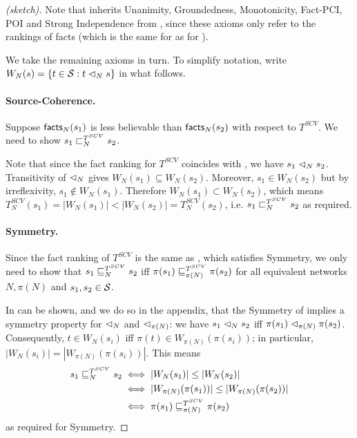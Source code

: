 \begin{proof}[ (sketch)]

Note that \scvoting{} inherits Unanimity, Groundedness, Monotonicity, Fact-PCI,
POI and Strong Independence from \voting{}, since these axioms only refer to
the rankings of facts (which is the same for \scvoting{} as for \voting{}).

We take the remaining axioms in turn. To simplify notation, write $W_N(s) = \{t
\in \S : t \scoh_N s \}$ in what follows.

\paragraph{Source-Coherence.}

Suppose $\facts_N(s_1)$ is less believable than $\facts_N(s_2)$ with respect to
$T^{SCV}$. We need to show $s_1 \slt_N^{T^{SCV}} s_2$.

Note that since the fact ranking for $T^{SCV}$ coincides with \voting{}, we
have $s_1 \scoh_N s_2$. Transitivity of ${\scoh_N}$ gives $W_N(s_1) \subseteq
W_N(s_2)$. Moreover, $s_1 \in W_N(s_2)$ but by irreflexivity, $s_1 \notin
W_N(s_1)$. Therefore $W_N(s_1) \subset W_N(s_2)$, which means $T_N^{SCV}(s_1) =
|W_N(s_1)| < |W_N(s_2)| = T_N^{SCV}(s_2)$, i.e.  $s_1 \slt_N^{T^{SCV}} s_2$ as
required.

\paragraph{Symmetry.} Since the fact ranking of $T^{SCV}$ is the same as
\voting{}, which satisfies Symmetry, we only need to show that $s_1
\sle_N^{T^{SCV}} s_2$ iff $\pi(s_1) \sle_{\pi(N)}^{T^{SCV}} \pi(s_2)$ for all
equivalent networks $N, \pi(N)$ and $s_1, s_2 \in \S$.

In can be shown, and we do so in the appendix, that the Symmetry of \voting{}
implies a symmetry property for ${\scoh_N}$ and ${\scoh_{\pi(N)}}$: we have
$s_1 \scoh_N s_2$ iff $\pi(s_1) \scoh_{\pi(N)} \pi(s_2)$. Consequently, $t \in
W_N(s_i)$ iff $\pi(t) \in W_{\pi(N)}(\pi(s_i))$; in particular, $|W_N(s_i)| =
|W_{\pi(N)}(\pi(s_i))|$. This means
\begin{align*}
    s_1 \sle_N^{T^{SCV}} s_2
    & \iff |W_N(s_1)| \le |W_N(s_2)| \\
    & \iff |W_{\pi(N)}(\pi(s_1))| \le |W_{\pi(N)}(\pi(s_2))| \\
    & \iff \pi(s_1) \sle_{\pi(N)}^{T^{SCV}} \pi(s_2)
\end{align*}
as required for Symmetry.


\end{proof}
